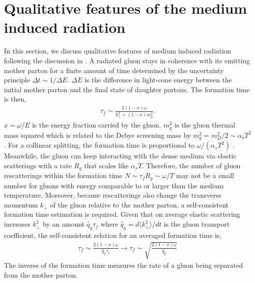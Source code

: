 \documentclass[aps, prc, reprint, amsmath, groupedaddress, nofootinbib]{revtex4-1}
\begin{document}
\section{Qualitative features of the medium induced radiation}\label{section:qual}
In this section, we discuss qualitative features of medium induced radiation following the discussion in \cite{Baier:1996kr}.
A radiated gluon stays in coherence with its emitting mother parton for a finite amount of time determined by the uncertainty principle $\Delta t \sim 1/\Delta E$. 
$\Delta E$ is the difference in light-cone energy between the initial mother parton and the final state of daughter partons.
The formation time is then,
\begin{eqnarray}\label{eq:tau_1}
\tau_f \sim \frac{2(1-x)\omega}{k_\perp^2+(1-x)m_g^2}.
\end{eqnarray}
$x = \omega/E$ is the energy fraction carried by the gluon. 
$m_g^2$ is the gluon thermal mass squared which is related to the Debye screening mass by $m_g^2 = m_D^2/2 \sim \alpha_s T^2$.
For a collinear splitting, the formation time is proportional to $\omega/(\alpha_s T^2)$ .
Meanwhile, the gluon can keep interacting with the dense medium via elastic scatterings with a rate $R_{g}$ that scales like $\alpha_s T$. 
Therefore, the number of gluon rescatterings within the formation time $N \sim \tau_f R_g \sim \omega/T$ may not be a small number for gluons with energy comparable to or larger than the medium temperature.
Moreover, because rescatterings also change the transverse momentum $k_\perp$ of the gluon relative to the mother parton, a self-consistent formation time estimation is required.
Given that on average elastic scattering increases $k_\perp^2$ by an amount $\hat{q}_g\tau_f$ where $\hat{q}_g = d\langle k_\perp^2\rangle/dt$ is the gluon transport coefficient, the self-consistent relation for an averaged formation time is,
\begin{eqnarray}\label{eq:tau_n}
\tau_f \sim \frac{2(1-x)\omega}{\hat{q}_g\tau_f} \longrightarrow \tau_f \sim \sqrt{\frac{2(1-x)\omega}{\hat{q}_g}}
\end{eqnarray}
The inverse of the formation time measures the rate of a gluon being separated from the mother parton.
\end{document}
